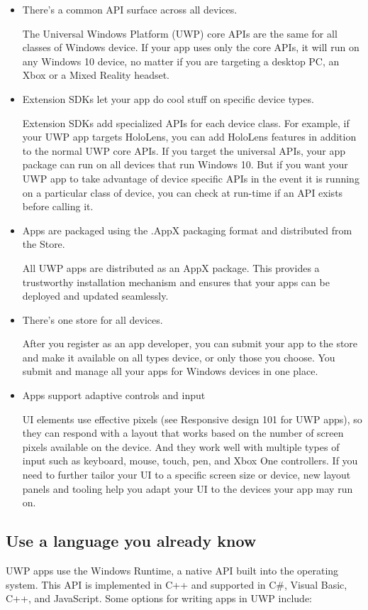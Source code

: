 \begin{itemize}
	\item There's a common API surface across all devices.
	
The Universal Windows Platform (UWP) core APIs are the same for all classes of Windows device. If your app uses only the core APIs, it will run on any Windows 10 device, no matter if you are targeting a desktop PC, an Xbox or a Mixed Reality headset.

\item Extension SDKs let your app do cool stuff on specific device types.

Extension SDKs add specialized APIs for each device class. For example, if your UWP app targets HoloLens, you can add HoloLens features in addition to the normal UWP core APIs. If you target the universal APIs, your app package can run on all devices that run Windows 10. But if you want your UWP app to take advantage of device specific APIs in the event it is running on a particular class of device, you can check at run-time if an API exists before calling it. 

\item Apps are packaged using the .AppX packaging format and distributed from the Store.

All UWP apps are distributed as an AppX package. This provides a trustworthy installation mechanism and ensures that your apps can be deployed and updated seamlessly.

\item There's one store for all devices.

After you register as an app developer, you can submit your app to the store and make it available on all types device, or only those you choose. You submit and manage all your apps for Windows devices in one place.

\item Apps support adaptive controls and input

UI elements use effective pixels (see Responsive design 101 for UWP apps), so they can respond with a layout that works based on the number of screen pixels available on the device. And they work well with multiple types of input such as keyboard, mouse, touch, pen, and Xbox One controllers. If you need to further tailor your UI to a specific screen size or device, new layout panels and tooling help you adapt your UI to the devices your app may run on.
\end{itemize}

\subsection{Use a language you already know}
UWP apps use the Windows Runtime, a native API built into the operating system. This API is implemented in C++ and supported in C\#, Visual Basic, C++, and JavaScript. Some options for writing apps in UWP include:

